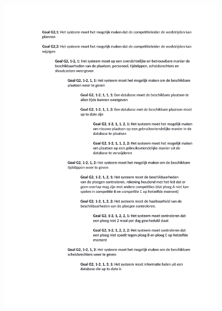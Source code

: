 \documentclass[12pt,a4paper]{article}
\begin{document}
			\begin{figure}[H]
				\includegraphics[width=\textwidth]{../2-Doelen/Goals2.pdf}
			\end{figure}
\end{document}
